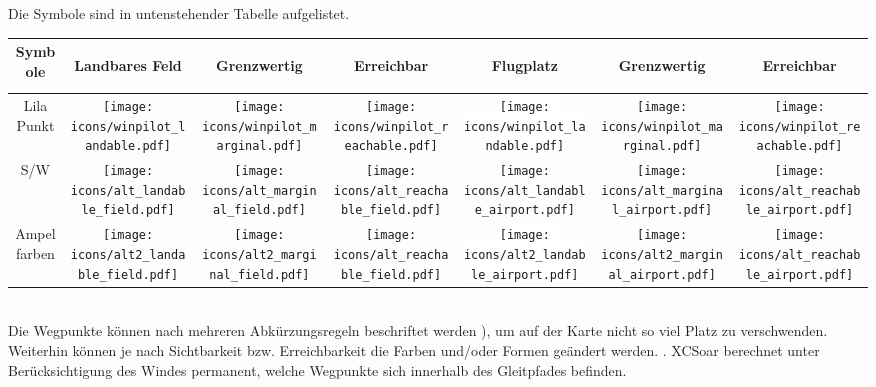 Die Symbole sind in untenstehender Tabelle aufgelistet. 

\begin{tabular}{c|ccc|ccc|}
Symbole
&\begin{sideways}Landbares Feld\end{sideways}
&\begin{sideways}Grenzwertig\end{sideways}
&\begin{sideways}Erreichbar\end{sideways}
&\begin{sideways}Flugplatz\end{sideways}
&\begin{sideways}Grenzwertig\end{sideways}
&\begin{sideways}Erreichbar\end{sideways}\\
\hline
Lila Punkt &
\texttt{[image: icons/winpilot\_landable.pdf]} &
\texttt{[image: icons/winpilot\_marginal.pdf]} &
\texttt{[image: icons/winpilot\_reachable.pdf]} &
\colorbox{white}{\texttt{[image: icons/winpilot\_landable.pdf]}} &
\texttt{[image: icons/winpilot\_marginal.pdf]} &
\texttt{[image: icons/winpilot\_reachable.pdf]} \\
\hline
S/W & 
\texttt{[image: icons/alt\_landable\_field.pdf]} &
\texttt{[image: icons/alt\_marginal\_field.pdf]} &
\texttt{[image: icons/alt\_reachable\_field.pdf]} &
\colorbox[rgb]{0.94,0.94,0.94}{\texttt{[image: icons/alt\_landable\_airport.pdf]}} &
\texttt{[image: icons/alt\_marginal\_airport.pdf]} &
\texttt{[image: icons/alt\_reachable\_airport.pdf]} \\
\hline
Ampelfarben & 
\texttt{[image: icons/alt2\_landable\_field.pdf]} &
\texttt{[image: icons/alt2\_marginal\_field.pdf]} &
\texttt{[image: icons/alt\_reachable\_field.pdf]} &
\colorbox{white}{\texttt{[image: icons/alt2\_landable\_airport.pdf]}} &
\texttt{[image: icons/alt2\_marginal\_airport.pdf]} &
\texttt{[image: icons/alt\_reachable\_airport.pdf]} \\
\hline
\end{tabular} \\

Die Wegpunkte können nach mehreren Abkürzungsregeln beschriftet werden ), um auf der Karte nicht so viel Platz zu verschwenden.  Weiterhin können je nach Sichtbarkeit bzw. Erreichbarkeit die Farben und/oder Formen geändert werden. . \textsf{XCSoar} berechnet unter Berücksichtigung des Windes permanent, welche Wegpunkte sich innerhalb des Gleitpfades befinden.

